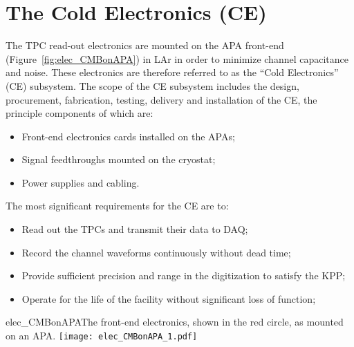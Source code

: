 \section{The Cold Electronics (CE)} 
\label{sec:detectors-fd-ref-ce}

The TPC read-out electronics are mounted on the APA front-end (Figure~\ref{fig:elec_CMBonAPA})
in LAr in order to minimize channel capacitance and noise. These electronics are therefore referred to as the ``Cold Electronics'' (CE) subsystem. 
The scope of the CE subsystem includes the design, procurement, fabrication, testing,
delivery and installation of the CE, the principle components of which are:
\begin{itemize}
\item Front-end electronics cards installed on the APAs;
\item Signal feedthroughs mounted on the cryostat;
\item Power supplies and cabling.
\end{itemize}
The most significant requirements for the CE are to:
\begin{itemize}	
\item Read out the TPCs and transmit their data to DAQ;
\item Record the channel waveforms continuously without dead time;
\item Provide sufficient precision and range in the digitization to satisfy the KPP;
\item Operate for the life of the facility without significant loss of function;
\end{itemize}
\begin{cdrfigure}{elec_CMBonAPA}{The front-end electronics,
shown in the red circle, as mounted on an APA.}
\texttt{[image: elec\_CMBonAPA\_1.pdf]}
\end{cdrfigure}

